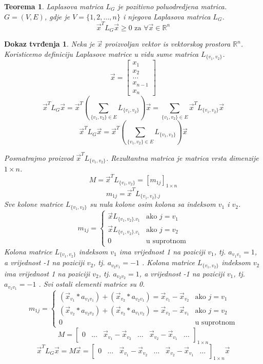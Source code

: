\documentclass[11pt]{article}
\newtheorem{theorem}{Teorema}
\newtheorem*{custom_proof}{Dokaz tvrđenja}
\begin{document}
	\begin{theorem} Laplasova matrica $L_G$ je pozitivno poluodredjena matrica.
	$G = (V, E)$, gdje je $V = \{1, 2, \dots, n\}$ i njegova Laplasova matrica $L_G$. 
	\[
	  \vec{x}^TL_G\vec{x} \geq 0 \text{ za } \forall \vec{x} \in \mathbb{R}^n
	\] 
	\end{theorem}
	\begin{custom_proof}
	Neka je $\vec{x}$ proizvoljan vektor is vektorskog prostora $\mathbb{R}^n$. Koristicemo definiciju Laplasove matrice u vidu sume matrica $L_{\{v_1,v_2\}}$.
	\[
	\vec{x} = 
	\begin{bmatrix} 
	x_1 \\ x_2 \\ \dots \\ x_{n-1} \\ x_n
	\end{bmatrix}
	\]
	\[
	  \vec{x}^TL_G\vec{x} = \vec{x}^T (\sum_{\{v_1,v_2\} \in E} L_{\{v_1,v_2\}}) \vec{x}  =  \sum_{\{v_1,v_2\} \in E} \vec{x}^TL_{\{v_1,v_2\}} \vec{x}
	\]
	\[
	  \vec{x}^TL_G\vec{x} =\vec{x}^T (\sum_{\{v_1,v_2\} \in E} L_{\{v_1,v_2\}}) \vec{x} 
	\]  
	
	Posmatrajmo proizvod $\vec{x}^T L_{\{v_1,v_2\}}$. Rezultantna matrica je matrica vrsta dimenzije $1 \times n$.
	\[
	M = \vec{x}^T L_{\{v_1,v_2\}} = [m_{1j}]_{1 \times n}
	\]
	\[
	m_{1j} = \vec{x}^T L_{\{v_1,v_2\} . j}
	\]
	Sve kolone matrice $L_{\{v_1,v_2\}}$ su nula kolone osim kolona sa indeksom $v_1$ i $v_2$.
	\[
	 m_{1j} =
	 \begin{cases}
	 \vec{x} L_{\{v_1,v_2\} . v_1}  & \text{ako } j = v_1 \\ 
	 \vec{x} L_{\{v_1,v_2\} . v_1}  & \text{ako } j = v_2  \\ 
	 0  & \text{u suprotnom}
	 \end{cases}
	\]
	Kolona matrice $L_{\{v_1,v_2\}}$ indeksom $v_1$ ima vrijednost 1 na poziciji $v_1$, tj. $a_{v_1 v_1} = 1$, a vrijednost -1 na poziciji $v_2$, tj. $a_{v_2 v_1} = -1$ .
	Kolona matrice $L_{\{v_1,v_2\}}$ indeksom $v_2$ ima vrijednost 1 na poziciji $v_2$, tj. $a_{v_2 v_2} = 1$, a vrijednost -1 na poziciji $v_1$, tj. $a_{v_1 v_1} = -1$ .
	Svi ostali elementi matrice su 0.
	\[
	 m_{1j} =
	 \begin{cases}
	 (\vec{x}_{v_1} * a_{v_1 v_1}) + (\vec{x}_{v_2} * a_{v_2 v_1}) = \vec{x}_{v_1} - \vec{x}_{v_2}   & \text{ako } j = v_1 \\ 
	 (\vec{x}_{v_2} * a_{v_2 v_2}) + (\vec{x}_{v_2} * a_{v_1 v_2}) = \vec{x}_{v_2} - \vec{x}_{v_1}  & \text{ako } j = v_2  \\ 
	 0  & \text{u suprotnom}
	 \end{cases}
	\]
	\[
	M = 
	\begin{bmatrix} 
	0 & \dots &  \vec{x}_{v_1} - \vec{x}_{v_2} & \dots &  \vec{x}_{v_2} - \vec{x}_{v_1} & \dots
	\end{bmatrix}
	_{1 \times n}
	\]
	\[
	  \vec{x}^TL_G\vec{x} = M \vec{x} =\begin{bmatrix} 
	0 & \dots &  \vec{x}_{v_1} - \vec{x}_{v_2} & \dots &  \vec{x}_{v_2} - \vec{x}_{v_1} & \dots
	\end{bmatrix}
	_{1 \times n} \vec{x}  
	\]
	

\end{custom_proof}
\end{document}
